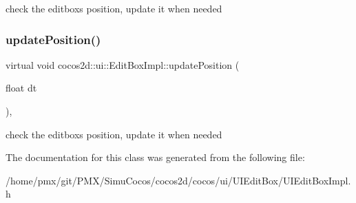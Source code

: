 check the editbox\textquotesingle{}s position, update it when needed \mbox{\label{classcocos2d_1_1ui_1_1EditBoxImpl_a3ec4de1b40e67defdccbdec284838762}} 
\subsubsection{\texorpdfstring{update\+Position()}{updatePosition()}\hspace{0.1cm}{\footnotesize\ttfamily [2/2]}}
{\footnotesize\ttfamily virtual void cocos2d\+::ui\+::\+Edit\+Box\+Impl\+::update\+Position (\begin{DoxyParamCaption}\item[{float}]{dt }\end{DoxyParamCaption})\hspace{0.3cm}{\ttfamily [inline]}, {\ttfamily [virtual]}}

check the editbox\textquotesingle{}s position, update it when needed 

The documentation for this class was generated from the following file\+:\begin{DoxyCompactItemize}
\item 
/home/pmx/git/\+P\+M\+X/\+Simu\+Cocos/cocos2d/cocos/ui/\+U\+I\+Edit\+Box/U\+I\+Edit\+Box\+Impl.\+h\end{DoxyCompactItemize}
